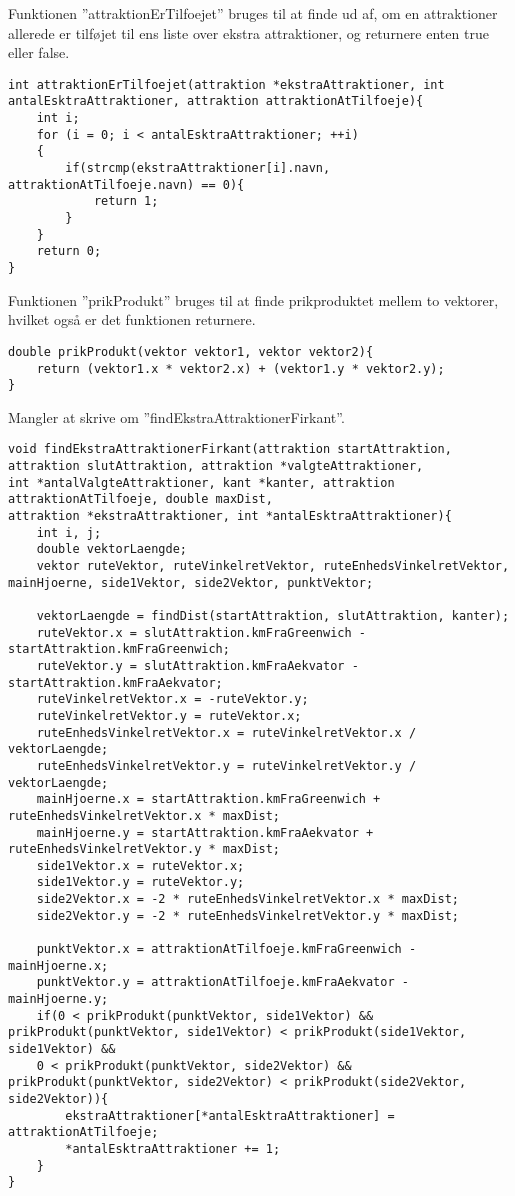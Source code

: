 Funktionen ”attraktionErTilfoejet” bruges til at finde ud af, om en attraktioner allerede er tilføjet til ens liste over ekstra attraktioner, og returnere enten true eller false.

\begin{lstlisting}
int attraktionErTilfoejet(attraktion *ekstraAttraktioner, int antalEsktraAttraktioner, attraktion attraktionAtTilfoeje){
	int i;
	for (i = 0; i < antalEsktraAttraktioner; ++i)
	{
		if(strcmp(ekstraAttraktioner[i].navn, attraktionAtTilfoeje.navn) == 0){
			return 1;
		}
	}
	return 0;
}
\end{lstlisting}

Funktionen ”prikProdukt” bruges til at finde prikproduktet mellem to vektorer, hvilket også er det funktionen returnere.

\begin{lstlisting}
double prikProdukt(vektor vektor1, vektor vektor2){
	return (vektor1.x * vektor2.x) + (vektor1.y * vektor2.y);
}
\end{lstlisting}

Mangler at skrive om ”findEkstraAttraktionerFirkant”.

\begin{lstlisting}
void findEkstraAttraktionerFirkant(attraktion startAttraktion, attraktion slutAttraktion, attraktion *valgteAttraktioner, 
int *antalValgteAttraktioner, kant *kanter, attraktion attraktionAtTilfoeje, double maxDist, 
attraktion *ekstraAttraktioner, int *antalEsktraAttraktioner){
	int i, j;
	double vektorLaengde;
	vektor ruteVektor, ruteVinkelretVektor, ruteEnhedsVinkelretVektor, mainHjoerne, side1Vektor, side2Vektor, punktVektor;
	
	vektorLaengde = findDist(startAttraktion, slutAttraktion, kanter);
	ruteVektor.x = slutAttraktion.kmFraGreenwich - startAttraktion.kmFraGreenwich;
	ruteVektor.y = slutAttraktion.kmFraAekvator - startAttraktion.kmFraAekvator;
	ruteVinkelretVektor.x = -ruteVektor.y;
	ruteVinkelretVektor.y = ruteVektor.x;
	ruteEnhedsVinkelretVektor.x = ruteVinkelretVektor.x / vektorLaengde;
	ruteEnhedsVinkelretVektor.y = ruteVinkelretVektor.y / vektorLaengde;
	mainHjoerne.x = startAttraktion.kmFraGreenwich + ruteEnhedsVinkelretVektor.x * maxDist;
	mainHjoerne.y = startAttraktion.kmFraAekvator + ruteEnhedsVinkelretVektor.y * maxDist;
	side1Vektor.x = ruteVektor.x;
	side1Vektor.y = ruteVektor.y;
	side2Vektor.x = -2 * ruteEnhedsVinkelretVektor.x * maxDist;
	side2Vektor.y = -2 * ruteEnhedsVinkelretVektor.y * maxDist;
	
	punktVektor.x = attraktionAtTilfoeje.kmFraGreenwich - mainHjoerne.x;
	punktVektor.y = attraktionAtTilfoeje.kmFraAekvator - mainHjoerne.y;
	if(0 < prikProdukt(punktVektor, side1Vektor) && prikProdukt(punktVektor, side1Vektor) < prikProdukt(side1Vektor, side1Vektor) &&
	0 < prikProdukt(punktVektor, side2Vektor) && prikProdukt(punktVektor, side2Vektor) < prikProdukt(side2Vektor, side2Vektor)){
		ekstraAttraktioner[*antalEsktraAttraktioner] = attraktionAtTilfoeje;
		*antalEsktraAttraktioner += 1;
	}
}
\end{lstlisting}

